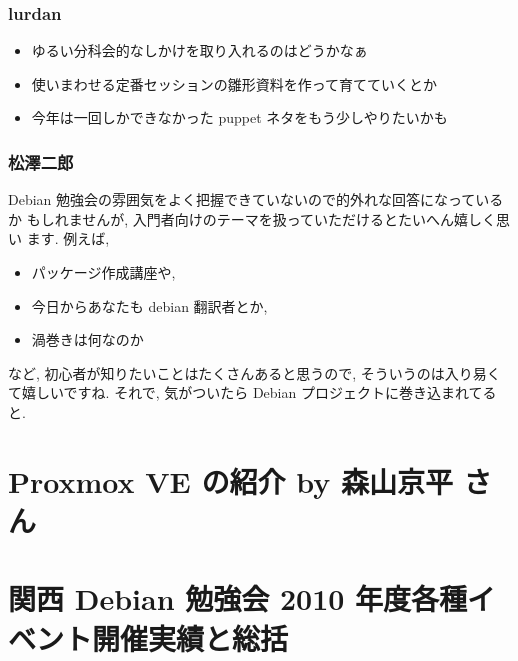 \documentclass[cjk,dvipdfmx,12pt,%
hyperref={bookmarks=true,bookmarksnumbered=true,bookmarksopen=false,%
colorlinks=false,%
pdftitle={第 42 回 関西 Debian 勉強会},%
pdfauthor={倉敷・のがた・佐々木},%
pdfsubject={資料},%
}]{beamer}
\begin{document}
\begin{frame}[fragile]
\frametitle{ lurdan }

\begin{itemize}
\item ゆるい分科会的なしかけを取り入れるのはどうかなぁ
\item 使いまわせる定番セッションの雛形資料を作って育てていくとか
\item 今年は一回しかできなかった puppet ネタをもう少しやりたいかも
\end{itemize}

\end{frame}

\begin{frame}[fragile]
\frametitle{ 松澤二郎 }

Debian 勉強会の雰囲気をよく把握できていないので的外れな回答になっているか
もしれませんが, 入門者向けのテーマを扱っていただけるとたいへん嬉しく思い
ます. 例えば,

\begin{itemize}
\item パッケージ作成講座や,
\item 今日からあなたも debian 翻訳者とか,
\item 渦巻きは何なのか
\end{itemize}

など, 初心者が知りたいことはたくさんあると思うので, そういうのは入り易く
て嬉しいですね. それで, 気がついたら Debian プロジェクトに巻き込まれてると.

\end{frame}





\section{Proxmox VE の紹介  by 森山京平 さん}





\section{関西 Debian 勉強会 2010 年度各種イベント開催実績と総括}
\end{document}
